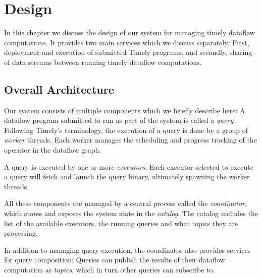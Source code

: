 \chapter{Design}\label{ch:design}

In this chapter we discuss the design of our system for managing timely dataflow
computations. It provides two main services which we discuss separately:
First, deployment and execution of submitted Timely programs, and secondly,
sharing of data streams between running timely dataflow computations.

\section{Overall Architecture}

Our system consists of multiple components which we briefly describe here:
A dataflow program submitted to run as part of the system is
called a \emph{query}. Following Timely's terminology, the execution of a query
is done by a group of \emph{worker} threads. Each worker manages the scheduling and
progress tracking of the operator in the dataflow graph. 

A query is executed by one or more \emph{executors}. Each executor selected to
execute a query will fetch and launch the query binary, ultimately spawning the
worker threads.

All these components are managed by a central process called the \emph{coordinator},
which stores and exposes the system state in the \emph{catalog}. The catalog includes
the list of the available executors, the running queries and what topics they
are processing.

In addition to managing query execution, the coordinator also provides services
for query composition: Queries can publish the results of their dataflow
computation as \emph{topics}, which in turn other queries can subscribe to.

